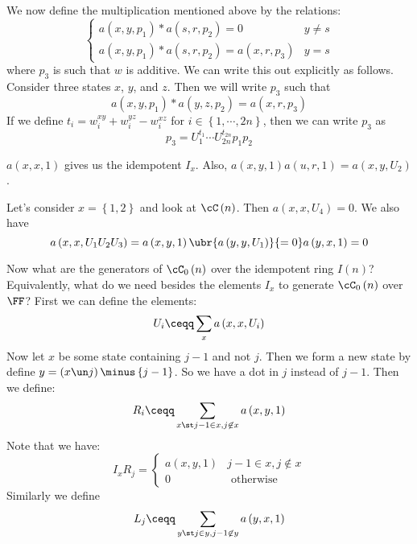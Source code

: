 \documentclass{amsproc}
\begin{document}
We now define the multiplication mentioned above by the relations:
\begin{equation}
\begin{cases}
a\left( x , y , p_1 \right) * a\left( s , r , p_2 \right) = 0
& y\neq s \\
a\left( x , y , p_1 \right) * a\left( s , r , p_2 \right) = 
a\left( x , r, p_3 \right)
& y = s
\end{cases}
\end{equation}
where $p_3$ is such that $w$ is additive.
We can write this out explicitly as follows. 
Consider three states $x$, $y$, and $z$. 
Then we will write $p_3$ such that
\begin{equation}
a\left( x , y , p_1 \right) * a\left( y , z , p_2 \right) = 
a\left( x , r, p_3 \right)
\end{equation}
If we define $t_i = w_i^{xy} + w_i^{yz} - w_i^{xz}$ for $i\in \left\{ 1 , \cdots , 2n \right\}$,
then we can write $p_3$ as
\begin{equation}
p_3 = U_1^{t_1}\cdots U_{2n}^{t_{2n}} p_1 p_2
\end{equation}

\begin{exm}
$a\left( x , x , 1 \right)$ gives us the idempotent $I_x$.
Also, $a\left( x , y , 1 \right) a\left( u , r , 1 \right) = a\left( x , y , U_2 \right)$.
\end{exm}

\begin{exm}
Let's consider $x = \left\{ 1,2 \right\}$ and look at $\cC\left( n \right)$. 
Then $a\left( x , x , U_4 \right) = 0$.
We also have 
\begin{equation}
a\left( x , x , U_1U_2U_3\right) = 
a\left( x,y,1 \right) \ubr{a\left( y , y , U_1 \right)}{=0} a\left( y,x,1 \right) = 0
\end{equation}
\end{exm}

Now what are the generators of $\cC_0\left( n \right)$ 
over the idempotent ring $I\left( n \right)$?
Equivalently, what do we need besides the elements $I_x$ to generate $\cC_0\left( n \right)$
over $\FF$?
First we can define the elements:
\begin{equation}
U_i \ceqq \sum_{x} a\left( x , x , U_i \right)
\end{equation}
Now let $x$ be some state containing $j-1$ and not $j$. 
Then we form a new state by define $y = \left( x\un j \right) \minus \left\{ j-1 \right\}$. 
So we have a dot in $j$ instead of $j-1$.
Then we define:
\begin{equation}
R_i \ceqq \sum_{x\st j-1\in x, j\not \in x} a\left( x , y , 1 \right)
\end{equation}
Note that we have:
\begin{equation}
I_x R_j = 
\begin{cases}
a\left( x , y , 1 \right)
& j-1\in x , j\not \in x \\
0 & \text{ otherwise }
\end{cases}
\end{equation}
Similarly we define
\begin{equation}
L_j \ceqq 
\sum_{y\st j\in y , j-1 \not \in y }
a\left( y , x , 1 \right)
\end{equation}
\end{document}
